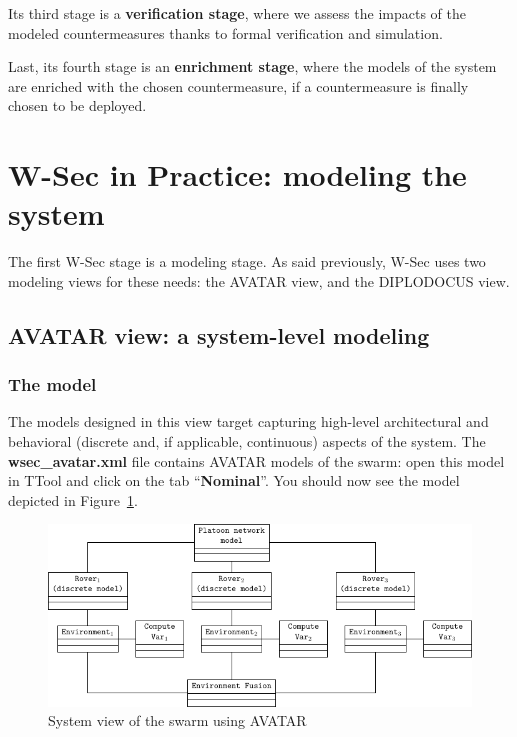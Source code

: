 \documentclass{article}
\begin{document}
Its third stage is a \textbf{verification stage}, where we assess the impacts of the modeled countermeasures thanks to formal verification and simulation.

Last, its fourth stage is an \textbf{enrichment stage}, where the models of the system are enriched with the chosen countermeasure, if a countermeasure is finally chosen to be deployed.


\section{W-Sec in Practice: modeling the system}

The first W-Sec stage is a modeling stage. As said previously, W-Sec uses two modeling views for these needs: the AVATAR view, and the DIPLODOCUS view.

\subsection{AVATAR view: a system-level modeling}

\subsubsection{The model}

The models designed in this view target capturing high-level architectural and behavioral (discrete and, if applicable, continuous) aspects of the system. The \textbf{wsec\_avatar.xml} file contains AVATAR models of the swarm: open this model in TTool and click on the tab ``\textbf{Nominal}''. You should now see the model depicted in Figure~\ref{fig:avatarmodel}.

\begin{figure}
	\centering
	\includegraphics{figures/avatarmodel.pdf}
	\caption{System view of the swarm using AVATAR}
	\label{fig:avatarmodel}
\end{figure}
\end{document}
